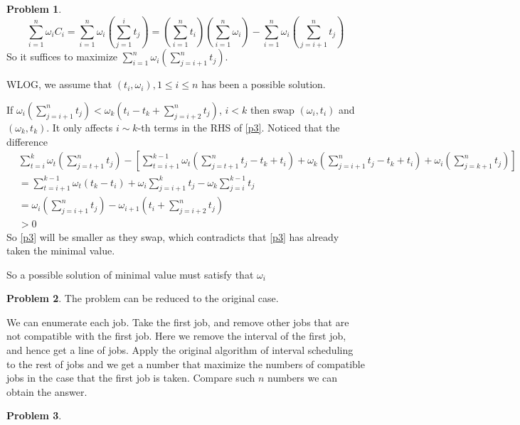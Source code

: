 \documentclass[a4paper]{article}
\theoremstyle{definition}
\newtheorem{problem}{Problem}
\theoremstyle{plain}
\newcommand{\dps}{\displaystyle}
\numberwithin{equation}{problem}
\begin{document}
\begin{problem}
  \begin{equation}\label{p3}
    \sum_{i=1}^n\omega_iC_i=\sum_{i=1}^n\omega_i\left(\sum_{j=1}^it_j\right)=(\sum_{i=1}^nt_i)(\sum_{i=1}^n\omega_i)-\sum_{i=1}^n\omega_i\left(\sum_{j=i+1}^nt_j\right)
  \end{equation}
  So it suffices to maximize  $ \dps\sum_{i=1}^n\omega_i\left(\sum_{j=i+1}^nt_j\right) $.

  WLOG, we assume that  $ (t_i,\omega_i),1 \leq i \leq n $ has been a possible solution.
  
  If  $ \dps\omega_i\left(\sum_{j=i+1}^nt_j\right) < \omega_{k}\left(t_i-t_k+\sum_{j=i+2}^nt_j\right) $, $ i<k $ 
  then swap  $ (\omega_i,t_i) $ and  $ (\omega_{k},t_{k}) $.   It only affects  $ i\sim k $-th terms  in the RHS of  \eqref{p3}. Noticed that the difference
  \begin{align*}
    &\sum_{t=i}^k\omega_t\left(\sum_{j=t+1}^nt_j\right)-\left[\sum_{t=i+1}^{k-1}\omega_t\left(\sum_{j=t+1}^nt_j-t_k+t_i\right)+\omega_k\left(\sum_{j=i+1}^nt_j-t_k+t_i\right)+\omega_i\left(\sum_{j=k+1}^nt_j\right)\right]\\
    &=\sum_{t={i+1}}^{k-1}\omega_t(t_k-t_i)+\omega_i\sum_{j=i+1}^kt_j-\omega_k\sum_{j=i}^{k-1}t_j\\
    &=\omega_i\left(\sum_{j=i+1}^nt_j\right)-\omega_{i+1}\left(t_i+\sum_{j=i+2}^nt_j\right)\\
    & > 0
  \end{align*}
  So \eqref{p3} will be smaller as they swap, which contradicts that  \eqref{p3} has already taken the minimal value. 

  So a possible solution of minimal value must satisfy that  $ \omega_i $ 
\end{problem}
\begin{problem}
  The problem can be reduced to the original case.
  
  We can enumerate each job. Take the first job, and remove other jobs that are not compatible with the first job. Here we remove the interval of the first job, and hence get a line of jobs. Apply the original algorithm of interval scheduling to the rest of jobs and we get a number that maximize the numbers of compatible jobs in the case that the first job is taken. Compare such  $ n $  numbers we can obtain the answer. 
\end{problem}
\begin{problem}
  
\end{problem}
\end{document}
